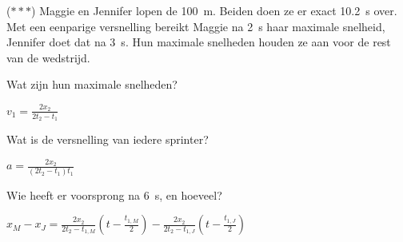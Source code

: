 \documentclass{ximera}
\begin{document}
\begin{exercise}
    ($\ast\ast\ast$) Maggie en Jennifer lopen de \SI{100}{m}. Beiden doen ze er exact \SI{10.2}{\second} over. Met een eenparige versnelling bereikt Maggie na \SI{2}{\second} haar maximale snelheid, Jennifer doet dat na \SI{3}{s}. Hun maximale snelheden houden ze aan voor de rest van de wedstrijd.
    \begin{question} Wat zijn hun maximale snelheden?                  \begin{oplossing} $v_1=\frac{2x_2}{2t_2-t_1}$                                                                             \end{oplossing} \end{question}
    \begin{question} Wat is de versnelling van iedere sprinter?        \begin{oplossing} $a=\frac{2x_2}{(2t_2-t_1)t_1}$                                                                          \end{oplossing} \end{question}
    \begin{question} Wie heeft er voorsprong na \SI{6}{s}, en hoeveel? 
        \begin{oplossing} $x_M-x_J=\frac{2x_2}{2t_2-t_{1,M}}(t-\frac{t_{1,M}}{2})-\frac{2x_2}{2t_2-t_{1,J}}(t-\frac{t_{1,J}}{2})$ 

        \begin{image}
        \end{image}
    
        \end{oplossing} 
    \end{question}




\end{exercise}
\end{document}
